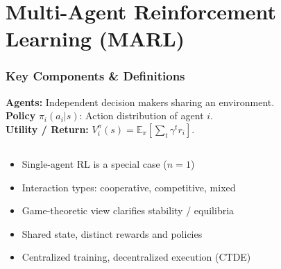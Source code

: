 \section{Multi-Agent Reinforcement Learning (MARL)}
\begin{frame}
    \frametitle{Key Components \& Definitions}
    \textbf{Agents:} Independent decision makers sharing an environment. \\
            \textbf{Policy }$\pi_i(a_i|s)$: Action distribution of agent $i$. \\
            \textbf{Utility / Return:} $V_i^{\pi}(s)=\mathbb{E}_\pi\!\left[\sum_t \gamma^t r_i\right]$.
    \begin{columns}[T]
        \begin{column}{0.52\textwidth}
            \small
            \begin{itemize}\setlength{\itemsep}{3pt}
                \item Single-agent RL is a special case ($n=1$)
                \item Interaction types: cooperative, competitive, mixed
                \item Game-theoretic view clarifies stability / equilibria
                \item Shared state, distinct rewards and policies
                \item Centralized training, decentralized execution (CTDE)
            \end{itemize}
        \end{column}
        \begin{column}{0.48\textwidth}
            \begin{figure}
            	\centering
\end{figure}
\end{column}
\end{columns}
\end{frame}
